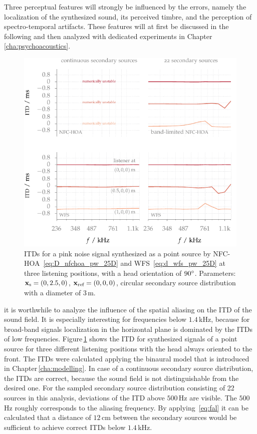 Three perceptual features will strongly be influenced by the errors,
namely the localization of the synthesized sound, its perceived
timbre, and the perception of spectro-temporal artifacts.
These features will at first be discussed in the following and then analyzed
with dedicated experiments in Chapter\,\ref{cha:psychoacoustics}.

%
\begin{figure}[tb]
    \vspace{-0.5cm}
    \includegraphics{fig3_17/fig3_17}
    \caption{\acp{ITD} for a pink noise signal synthesized as a point source by
    \ac{NFC-HOA}~\protect\eqref{eq:D_nfchoa_pw_25D} and
    \ac{WFS}~\protect\eqref{eq:d_wfs_pw_25D} at three listening
    positions, with a head orientation of $90^\circ$.
    Parameters: $\mathbf{x}_\text{s} =(0,2.5,0)$, $\mathbf{x}_\text{ref} = (0,0,0)$, circular secondary source
    distribution with a diameter of $3$\,m.
    }
    \label{fig:sfs_itd}
\end{figure}
%
 it is worthwhile to analyze the influence of the
spatial aliasing on the \ac{ITD} of the sound field. It is especially
interesting for frequencies below $1.4$\,kHz, because for broad-band signals
localization in the horizontal plane
is dominated by the \acp{ITD} of low
frequencies.
Figure\,\ref{fig:sfs_itd} shows the \ac{ITD} for synthesized signals of a
point source for three different listening positions with the head always
oriented to the front. The \acp{ITD} were
calculated applying the binaural model that is introduced in
Chapter\,\ref{cha:modelling}.
In case of a continuous secondary source distribution, the \acp{ITD} are correct, because
the sound field is not distinguishable from the desired one. For the sampled
secondary source distribution consisting of 22 sources in this analysis, deviations of the
\ac{ITD} above $500$\,Hz are visible. The $500$\,Hz roughly corresponds to
the aliasing frequency. By applying~\eqref{eq:fal} it can be calculated that a
distance of $12$\,cm between the secondary sources would be sufficient to
achieve correct \acp{ITD} below $1.4$\,kHz.

